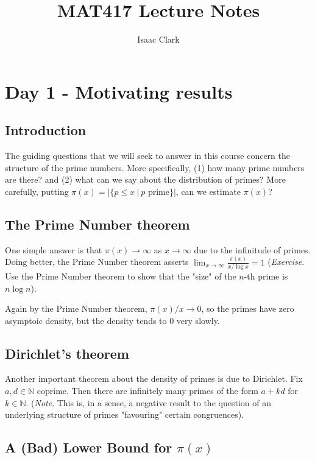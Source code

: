 \documentclass[12pt]{article}
\title{MAT417 Lecture Notes}
\author{Isaac Clark}
\newcommand{\nats}{\mathbb{N}}
\numberwithin{equation}{section}
\numberwithin{thm}{section}
\numberwithin{lemma}{section}
\numberwithin{cor}{section}
\begin{document}
\maketitle 

\section{Day 1 - Motivating results}

\subsection{Introduction}

The guiding questions that we will seek to answer in this course concern the structure of the prime numbers. More specifically, (1) how many prime numbers are there? and (2) what can we say about the distribution of primes? More carefully, putting $\pi(x) = |\{ p \leq x \ | \ p \text{ prime} \}|$, can we estimate $\pi(x)$? 

\subsection{The Prime Number theorem}

One simple answer is that $\pi(x) \to \infty$ as $x \to \infty$ due to the infinitude of primes. Doing better, the Prime Number theorem asserts $\lim_{x \to \infty} \frac{\pi(x)}{x / \log x} = 1$ (\textit{Exercise}. Use the Prime Number theorem to show that the "size" of the $n$-th prime is $n \log n$). 

Again by the Prime Number theorem, $\pi(x)/x \to 0$, so the primes have zero asymptoic density, but the density tends to $0$ very slowly.

\subsection{Dirichlet's theorem}

Another important theorem about the density of primes is due to Dirichlet. Fix $a, d \in \nats$ coprime. Then there are infinitely many primes of the form $a + kd$ for $k \in \nats$. (\textit{Note}. This is, in a sense, a negative result to the question of an underlying structure of primes "favouring" certain congruences).

\subsection{A (Bad) Lower Bound for $\pi(x)$}
\end{document}
